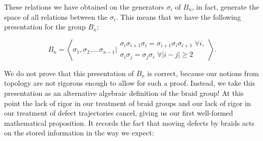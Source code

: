 These relations we have obtained on the generators $\sigma_i$ of $B_n$, in fact, generate the space of all relations between the $\sigma_i$. This means that we have the following presentation for the group $B_n$:

$$B_n=\left<\left.\sigma_1,\sigma_2,...\sigma_{n-1}\right| \substack{ \sigma_{i}\sigma_{i+1}\sigma_{i}=\sigma_{i+1}\sigma_{i}\sigma_{i+1}\,\, \forall i, \\ \sigma_i\sigma_j=\sigma_j\sigma_i \,\,\forall |i-j|\geq 2}\right>.$$

We do not prove that this presentation of $B_n$ is correct, because our notions from topology are not rigorous enough to allow for such a proof. Instead, we take this presentation as an alternative algebraic definition of the braid group! At this point the lack of rigor in our treatment of braid groups and our lack of rigor in our treatment of defect trajectories cancel, giving us our first well-formed mathematical proposition. It records the fact that moving defects by braids acts on the stored information in the way we expect:


